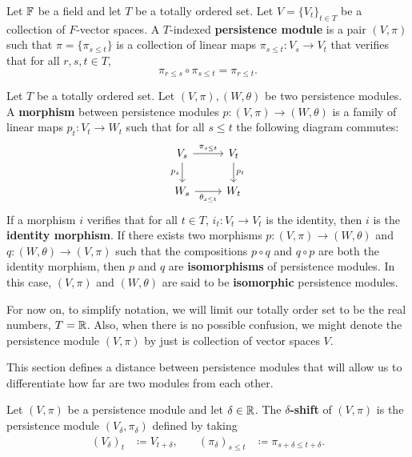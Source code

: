 \begin{definition}
    Let $\mathbb F$ be a field and let $T$ be a totally ordered set. Let $ V = \{V_t\}_{t \in T} $ be a collection of $F$-vector spaces. A $T$-indexed {\bf persistence module} is a pair $ (V, \pi) $ such that $ \pi = \{ \pi_{s \leq t} \} $ is a collection of linear maps $ \pi_{s \leq t}\colon V_s \rightarrow V_t $ that verifies that for all $ r, s, t \in T $,
    \begin{equation}
        \pi_{r \leq s} \circ \pi_{s \leq t} = \pi_{r \leq t}.
    \end{equation}
\end{definition}

\begin{definition}
    Let $T$ be a totally ordered set. Let $ (V, \pi), (W, \theta) $ be two persistence modules. A {\bf morphism} between persistence modules $ p \colon (V, \pi) \to (W, \theta) $ is a family of linear maps $ p_t \colon V_t \to W_t $ such that for all $ s \leq t $ the following diagram commutes:
    $$
    \begin{tikzcd}
        V_s \arrow[r, "\pi_{s \leq t}"] \arrow[d, "p_s"'] & V_t \arrow[d, "p_t"] \\
        W_s \arrow[r, "\theta_{s \leq t}"']               & W_t
    \end{tikzcd}
    $$
    If a morphism $ i $ verifies that for all $ t \in T $, $ i_t \colon V_t \to V_t $ is the identity, then $ i $ is the {\bf identity morphism}. If there exists two morphisms $ p \colon (V, \pi) \to (W, \theta) $ and $ q \colon (W, \theta) \to (V, \pi) $ such that the compositions $ p \circ q $ and $ q \circ p $ are both the identity morphism, then $ p $ and $ q $ are {\bf isomorphisms} of persistence modules. In this case, $ (V, \pi) $ and $ (W, \theta) $ are said to be {\bf isomorphic} persistence modules.
\end{definition}

For now on, to simplify notation, we will limit our totally order set to be the real numbers, $ T = \mathbb R $. Also, when there is no possible confusion, we might denote the persistence module $ (V, \pi) $ by just is collection of vector spaces $ V $. 

This section defines a distance between persistence modules that will allow us to differentiate how far are two modules from each other.

\begin{definition}
    Let $ (V, \pi) $ be a persistence module and let $ \delta \in \mathbb R $. The {\bf $\delta$-shift} of $ (V, \pi) $ is the persistence module $ (V_\delta, \pi_\delta) $ defined by taking
    \begin{align}
        (V_\delta)_t &\coloneq V_{t+\delta}, \quad & (\pi_\delta)_{s\leq t} &\coloneq \pi_{s+\delta \leq t+\delta}.
    \end{align}
\end{definition}

